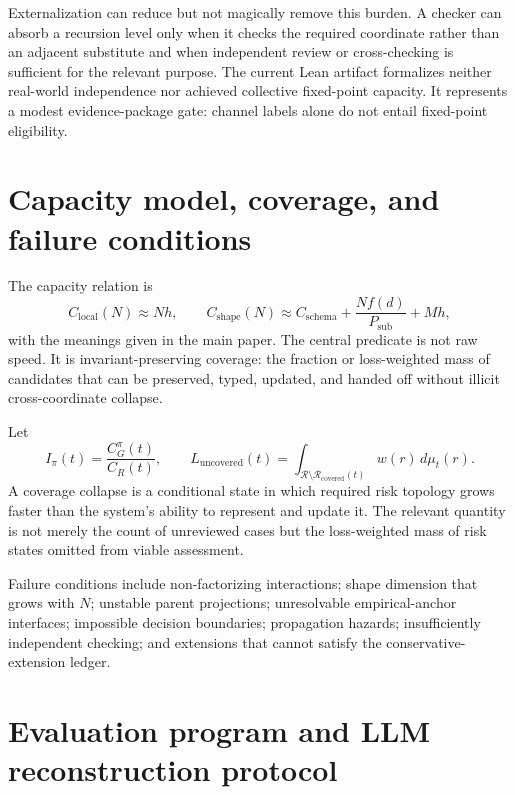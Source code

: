 \documentclass[10pt]{article}
\newcommand{\Risk}{\mathcal{R}}
\begin{document}
Externalization can reduce but not magically remove this burden. A checker can absorb a recursion level only when it checks the required coordinate rather than an adjacent substitute and when independent review or cross-checking is sufficient for the relevant purpose. The current Lean artifact formalizes neither real-world independence nor achieved collective fixed-point capacity. It represents a modest evidence-package gate: channel labels alone do not entail fixed-point eligibility.

\section{Capacity model, coverage, and failure conditions}
\label{sec:capacity}

The capacity relation is
\begin{equation}
C_{\mathrm{local}}(N)\approx Nh,\qquad
C_{\mathrm{shape}}(N)\approx C_{\mathrm{schema}}+\frac{Nf(d)}{P_{\mathrm{sub}}}+Mh,
\label{eq:capacity-supp}
\end{equation}
with the meanings given in the main paper. The central predicate is not raw speed. It is invariant-preserving coverage: the fraction or loss-weighted mass of candidates that can be preserved, typed, updated, and handed off without illicit cross-coordinate collapse.

Let
\begin{equation}
I_\pi(t)=\frac{C_G^\pi(t)}{C_R(t)},\qquad
L_{\mathrm{uncovered}}(t)=\int_{\Risk\setminus\Risk_{\mathrm{covered}}(t)}w(r)\,d\mu_t(r).
\end{equation}
A coverage collapse is a conditional state in which required risk topology grows faster than the system's ability to represent and update it. The relevant quantity is not merely the count of unreviewed cases but the loss-weighted mass of risk states omitted from viable assessment.

Failure conditions include non-factorizing interactions; shape dimension that grows with $N$; unstable parent projections; unresolvable empirical-anchor interfaces; impossible decision boundaries; propagation hazards; insufficiently independent checking; and extensions that cannot satisfy the conservative-extension ledger.

\section{Evaluation program and LLM reconstruction protocol}
\label{sec:evaluation}
\end{document}
